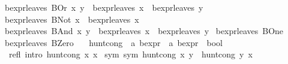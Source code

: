 \begin{isabellebody}
{}\ {}bexpr{}leaves\ {}BOr\ x\ y{}\ {}\ bexpr{}leaves\ x\ {}\ bexpr{}leaves\ y{}\isanewline
{}\ {}bexpr{}leaves\ {}BNot\ x{}\ {}\ bexpr{}leaves\ x{}\isanewline
{}\ {}bexpr{}leaves\ {}BAnd\ x\ y{}\ {}\ bexpr{}leaves\ x\ {}\ bexpr{}leaves\ y{}\isanewline
{}\ {}bexpr{}leaves\ BOne\ {}\ {}{}{}\isanewline
{}\ {}bexpr{}leaves\ BZero\ {}\ {}{}{}\isanewline
\isanewline
{}\isamarkupfalse%
\ hunt{}cong\ {}{}\ {}{}a\ bexpr\ {}\ {}a\ bexpr\ {}\ bool{}\ \isanewline
\ \ refl\ {}intro{}{}\ {}hunt{}cong\ x\ x{}\isanewline
{}\ sym\ {}sym{}{}\ {}hunt{}cong\ x\ y\ {}\ hunt{}cong\ y\ x{}\isanewline

\end{isabellebody}
